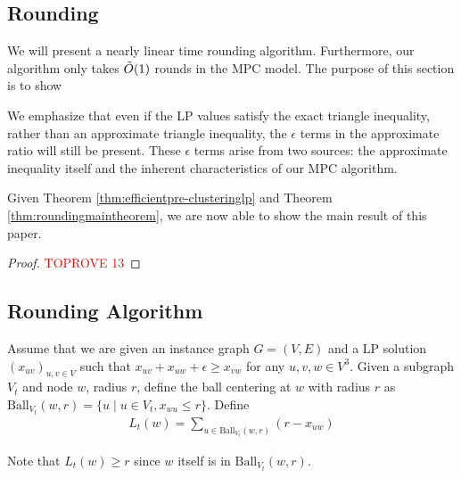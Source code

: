 \documentclass[11pt]{article}
\newcommand{\ball}{\mathrm{Ball}}
\begin{document}
\begin{CJK*}{UTF8}{gbsn}
 
\section{Rounding}
\label{sec:MPC-solve-rounding}
We will present a nearly linear time rounding algorithm. Furthermore, our algorithm only takes $\Tilde{O}(1)$ rounds in the MPC model. The purpose of this section is to show 

\thmroundingmain*

We emphasize that even if the LP values satisfy the exact triangle inequality, rather than an approximate triangle inequality, the $\epsilon$ terms in the approximate ratio will still be present. These $\epsilon$ terms arise from two sources: the approximate inequality itself and the inherent characteristics of our MPC algorithm.

Given Theorem \ref{thm:efficientpre-clusteringlp} and Theorem \ref{thm:roundingmaintheorem}, we are now able to show the main result of this paper.

\begin{proof}\textcolor{red}{TOPROVE 13}\end{proof}



\subsection{Rounding Algorithm}
Assume that we are given an instance graph $G = (V, E)$ and a LP solution $( x_{uv} )_{u,v \in V}$ such that $x_{uv} + x_{uw} + \epsilon \geq x_{vw}$ for any $u, v, w \in V^3$.  Given a subgraph $V_t$ and node $w$, radius $r$, define the ball centering at $w$ with radius $r$ as $\ball_{V_t}(w, r) = \{ u \mid u \in V_t, x_{wu} \leq r \} $. Define  
\begin{align*}
    L_t(w) = \sum_{u \in \ball_{V_t}(w, r) }( r - x_{uw} )
\end{align*}

Note that $L_t(w) \geq r$ since $w$ itself is in $ \ball_{V_t}(w, r)$.


\end{CJK*}
\end{document}
